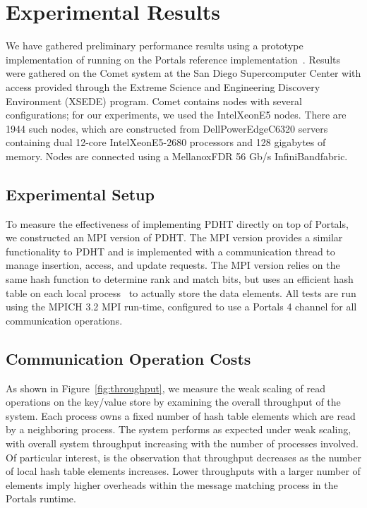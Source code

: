 \section{Experimental Results}



We have gathered preliminary performance results using a prototype
implementation of \pdht running on the Portals reference
implementation~\cite{portals-code}.  Results were gathered on the Comet
system at the San Diego Supercomputer Center with access provided
through the Extreme Science and Engineering Discovery Environment (XSEDE)
program.  Comet contains nodes with several configurations; for our
experiments, we used the Intel\regtm Xeon\regtm E5 nodes.  There are 1944 such
nodes, which are constructed from Dell\othertm PowerEdge\othertm C6320 servers
containing dual 12-core Intel\regtm Xeon\regtm E5-2680 processors and 128
gigabytes of memory.  Nodes are connected using a Mellanox\othertm FDR 56 Gb/s
InfiniBand\othertm fabric.


\subsection{Experimental Setup}

To measure the effectiveness of implementing PDHT directly on top of Portals, 
we constructed an MPI version of PDHT. The MPI version provides a similar
functionality to PDHT and is implemented with a communication thread to 
manage insertion, access, and update requests. The MPI version relies
on the same hash function to determine rank and match bits, but
uses an efficient hash table on each local process~\cite{uthash} to
actually store the data elements. All tests are run using the MPICH
3.2 MPI run-time, configured to use a Portals 4 channel for all
communication operations.

\subsection{Communication Operation Costs}


As shown in Figure~\ref{fig:throughput}, we measure the weak scaling
of \pdht read operations on the key/value store by examining the
overall throughput of the system. Each process owns a fixed number of
hash table elements which are read by a neighboring process. The
system performs as expected under weak scaling, with overall system
throughput increasing with the number of processes involved. Of
particular interest, is the observation that throughput decreases as
the number of local hash table elements increases. Lower throughputs
with a larger number of elements imply higher overheads
within the message matching process in the Portals runtime.


